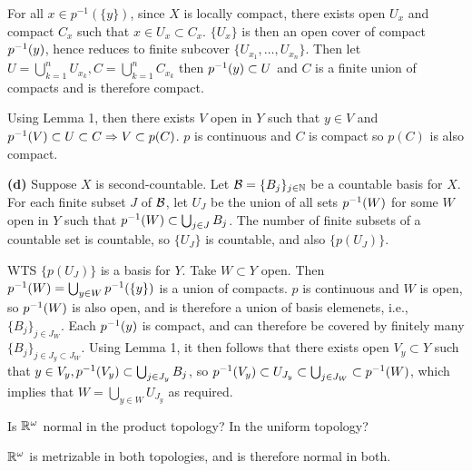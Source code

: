 \documentclass[a4paper, 10pt]{article}
\begin{document}
\begin{solution}
    For all $x \in p^{-1}(\{y\})$, since $X$ is locally compact, there exists open $U_x$ and compact $C_x$ such that $x \in U_x \subset C_x$. $\{U_x\}$ is then an open cover of compact ${p}^{-1}(y)$, hence reduces to finite subcover $\{U_{x_1}, \ldots, U_{x_n} \}$. Then let $U = \bigcup_{k =1}^n U_{x_k}, C =  \bigcup_{k =1}^n C_{x_k}$ then ${p}^{-1}(y) \subset U$ and $C$ is a finite union of compacts and is therefore compact.

    Using Lemma 1, then there exists $V$ open in $Y$ such that $y \in V$ and ${p}^{-1}(V) \subset U \subset C \Rightarrow V \subset p(C)$. $p$ is continuous and $C$ is compact so $p(C)$ is also compact.

    \textbf{(d)} Suppose $X$ is second-countable. Let $\mathcal{B} = \{B_j\}_{j \in \mathbb{N}}$ be a countable basis for $X$. For each finite subset $J$ of $\mathcal{B}$, let $U_J$ be the union of all sets ${p}^{-1}(W)$ for some $W$ open in $Y$ such that ${p}^{-1}(W) \subset \bigcup_{j \in J}B_j$. The number of finite subsets of a countable set is countable, so $\{U_J\}$ is countable, and also $\{p(U_J)\}$.

    WTS $\{p(U_J)\}$ is a basis for $Y$. Take $W \subset Y$ open. Then ${p}^{-1}(W) = \bigcup_{y \in W} {p}^{-1}(\{y\})$ is a union of compacts. $p$ is continuous and $W$ is open, so ${p}^{-1}(W)$ is also open, and is therefore a union of basis elemenets, i.e., $\{B_j\}_{j \in J_W}$. Each ${p}^{-1}(y)$ is compact, and can therefore be covered by finitely many $\{B_j\}_{j \in J_y \subset J_W}$. Using Lemma 1, it then follows that there exists open $V_y \subset Y$ such that $y \in V_y, {p}^{-1}(V_y)\subset \bigcup_{j \in J_y} B_j$, so ${p}^{-1}(V_y) \subset U_{J_y} \subset \bigcup_{j \in J_W} \subset {p}^{-1}(W)$, which implies that $W = \bigcup_{y \in W} U_{J_y}$ as required.
\end{solution}

\begin{problem} 
Is $\mathbb{R}^\omega$ normal in the product topology? In the uniform topology?
\end{problem}
\begin{solution}
    $\mathbb{R}^\omega$ is metrizable in both topologies, and is therefore normal in both.
\end{solution}
\end{document}

